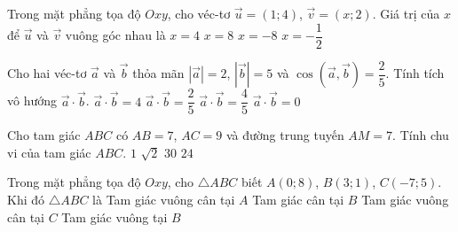 \begin{ex}%
	Trong mặt phẳng tọa độ $Oxy$, cho véc-tơ $\overrightarrow{u}=(1;4)$, $\overrightarrow{v} = (x;2)$. Giá trị của $x$ để $\overrightarrow{u}$ và $\overrightarrow{v}$ vuông góc nhau là
	\choice
	{$x=4$}
	{$x=8$}
	{\True $x=-8$}
	{$x=-\dfrac{1}{2}$}
\end{ex}
\begin{ex}%
	Cho hai véc-tơ $\overrightarrow{a}$ và $\overrightarrow{b}$ thỏa mãn $\left|\overrightarrow{a}\right|=2$, $\left|\overrightarrow{b}\right| = 5$ và $\cos \left(\overrightarrow{a},\overrightarrow{b}\right)=\dfrac{2}{5}$. Tính tích vô hướng $\overrightarrow{a}\cdot \overrightarrow{b}$.
	\choice
	{\True $\overrightarrow{a}\cdot \overrightarrow{b}=4$}
	{$\overrightarrow{a}\cdot \overrightarrow{b}=\dfrac{2}{5}$}
	{$\overrightarrow{a}\cdot \overrightarrow{b}=\dfrac{4}{5}$}
	{$\overrightarrow{a}\cdot \overrightarrow{b}=0$}
\end{ex}
\begin{ex}%
	Cho tam giác $ABC$ có $AB = 7$, $AC = 9$ và đường trung tuyến $AM=7$. Tính chu vi của tam giác $ABC$.
	\choice
	{$1$}
	{$\sqrt{2}$}
	{$30$}
	{\True $24$}
\end{ex}
\begin{ex}%
	Trong mặt phẳng tọa độ $Oxy$, cho $\triangle ABC$ biết $A(0;8)$, $B(3;1)$, $C(-7;5)$. Khi đó $\triangle ABC$ là
	\choice
	{\True Tam giác vuông cân tại $A$}
	{Tam giác cân tại $B$}
	{Tam giác vuông cân tại $C$}
	{Tam giác vuông tại $B$}
\end{ex}

